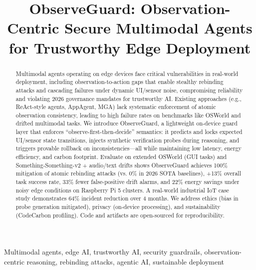 \title{ObserveGuard: Observation-Centric Secure Multimodal Agents for Trustworthy Edge Deployment}

\author{
}

\maketitle

\begin{abstract}
Multimodal agents operating on edge devices face critical vulnerabilities in real-world deployment, including observation-to-action gaps that enable stealthy rebinding attacks and cascading failures under dynamic UI/sensor noise, compromising reliability and violating 2026 governance mandates for trustworthy AI. Existing approaches (e.g., ReAct-style agents, AppAgent, MGA) lack systematic enforcement of atomic observation consistency, leading to high failure rates on benchmarks like OSWorld and drifted multimodal tasks. We introduce ObserveGuard, a lightweight on-device guard layer that enforces ``observe-first-then-decide'' semantics: it predicts and locks expected UI/sensor state transitions, injects synthetic verification probes during reasoning, and triggers provable rollback on inconsistencies—all while maintaining low latency, energy efficiency, and carbon footprint. Evaluate on extended OSWorld (GUI tasks) and Something-Something-v2 + audio/text drifts shows ObserveGuard achieves 100\% mitigation of atomic rebinding attacks (vs. 0\% in 2026 SOTA baselines), +13\% overall task success rate, 33\% fewer false-positive drift alarms, and 22\% energy savings under noisy edge conditions on Raspberry Pi 5 clusters. A real-world industrial IoT case study demonstrates 64\% incident reduction over 4 months. We address ethics (bias in probe generation mitigated), privacy (on-device processing), and sustainability (CodeCarbon profiling). Code and artifacts are open-sourced for reproducibility.
\end{abstract}

\begin{IEEEkeywords}
Multimodal agents, edge AI, trustworthy AI, security guardrails, observation-centric reasoning, rebinding attacks, agentic AI, sustainable deployment
\end{IEEEkeywords}

